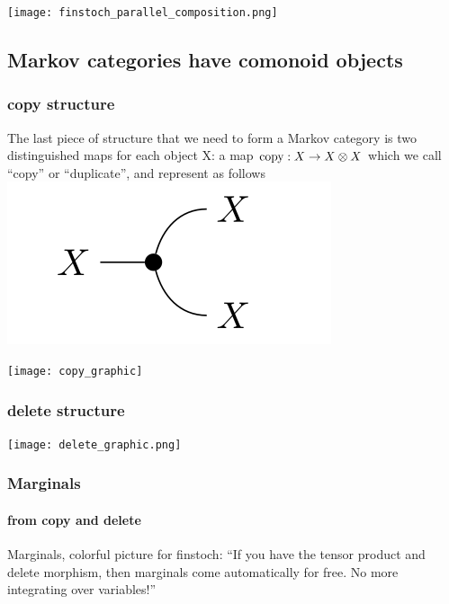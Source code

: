 \begin{frame}
    \begin{center}
        \texttt{[image: finstoch\_parallel\_composition.png]}
    \end{center}
\end{frame}

\subsection{Markov categories have comonoid objects}
\begin{frame}
    \frametitle{copy structure}
    \begin{minipage}{.55\textwidth}
        The last piece of structure that we need to form a Markov category is two distinguished maps for each object X: a map $\text{\normalfont copy}: X\to X\otimes X$ which we call “copy” or “duplicate”, and represent as follows
        \includegraphics[width=.4\textwidth]{graphics/string/markov_copy.png}
    \end{minipage}
    \hfill
    \begin{minipage}{.4\textwidth}
        \texttt{[image: copy\_graphic]}
    \end{minipage}
\end{frame}


\begin{frame}
    \frametitle{delete structure}
    \begin{minipage}{.48\textwidth}
    \end{minipage}
    \hfill
    \begin{minipage}{.48\textwidth}
        \texttt{[image: delete\_graphic.png]}
    \end{minipage}
\end{frame}

\begin{frame}[t]
    \frametitle{Marginals}
    \framesubtitle{from copy and delete}
    Marginals, colorful picture for finstoch: “If you have the tensor product and delete morphism, then marginals come automatically for free. No more integrating over variables!”
\end{frame}

